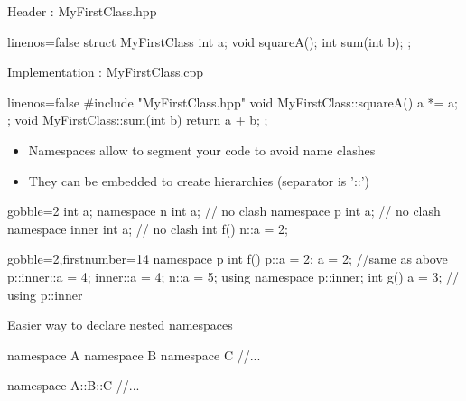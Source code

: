 \begin{frame}[fragile]
  \begin{block}{Header : MyFirstClass.hpp}
    \begin{cppcode*}{linenos=false}
      struct MyFirstClass {
        int a;
        void squareA();
        int sum(int b);
      };
    \end{cppcode*}
  \end{block}
  \begin{block}{Implementation : MyFirstClass.cpp}
    \begin{cppcode*}{linenos=false}
      #include "MyFirstClass.hpp"
      void MyFirstClass::squareA() {
        a *= a;
      };
      void MyFirstClass::sum(int b) {
        return a + b;
      };
    \end{cppcode*}
  \end{block}
\end{frame}

\begin{frame}[fragile]
  \begin{itemize}
  \item Namespaces allow to segment your code to avoid name clashes
  \item They can be embedded to create hierarchies (separator is '::')
  \end{itemize}
  \begin{multicols}{2}
    \begin{cppcode*}{gobble=2}
      int a;
      namespace n {
        int a;   // no clash
      }      
      namespace p {
        int a;   // no clash
        namespace inner {
          int a; // no clash
        }
      }
      int f() {
        n::a = 2;
      }
    \end{cppcode*}
    \columnbreak
    \begin{cppcode*}{gobble=2,firstnumber=14}
      namespace p {
        int f() {
          p::a = 2;
          a = 2;  //same as above
          p::inner::a = 4;
          inner::a = 4;
          n::a = 5;
        }
      }
      using namespace p::inner;
      int g() {
        a = 3; // using p::inner
      }
  \end{cppcode*}
  \end{multicols}
\end{frame}

\begin{frame}[fragile]
  Easier way to declare nested namespaces
  \begin{alertblock}{}
    \begin{cppcode*}{}
      namespace A {
        namespace B {
          namespace C {
            //...
          }
        }
      }
    \end{cppcode*}
  \end{alertblock}
  \begin{exampleblock}{}
    \begin{cppcode*}{}
      namespace A::B::C {
        //...
      }
    \end{cppcode*}    
  \end{exampleblock}
\end{frame}

